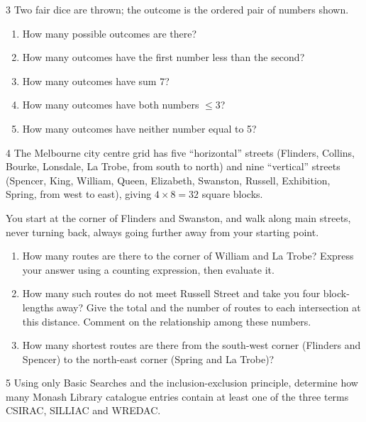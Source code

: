 \begin{exercise}{3}
    Two fair dice are thrown; the outcome is the ordered pair of numbers shown.
    \begin{enumerate}[label=(\alph*)]
        \item How many possible outcomes are there?
        \item How many outcomes have the first number less than the second?
        \item How many outcomes have sum 7?
        \item How many outcomes have both numbers $\le3$?
        \item How many outcomes have neither number equal to 5?
    \end{enumerate}
\end{exercise}

\begin{exercise}{4}
    The Melbourne city centre grid has five ``horizontal'' streets (Flinders,
    Collins, Bourke, Lonsdale, La Trobe, from south to north) and nine
    ``vertical'' streets (Spencer, King, William, Queen, Elizabeth, Swanston,
    Russell, Exhibition, Spring, from west to east), giving $4\times8=32$ square
    blocks.

    You start at the corner of Flinders and Swanston, and walk along main streets,
    never turning back, always going further away from your starting point.
    \begin{enumerate}[label=(\alph*)]
        \item How many routes are there to the corner of William and La Trobe?
              Express your answer using a counting expression, then evaluate it.
        \item How many such routes do not meet Russell Street and take you four
              block-lengths away? Give the total and the number of routes to each
              intersection at this distance. Comment on the relationship among
              these numbers.
        \item How many shortest routes are there from the south-west corner
              (Flinders and Spencer) to the north-east corner (Spring and La
              Trobe)?
    \end{enumerate}
\end{exercise}

\begin{exercise}{5}
    Using only Basic Searches and the inclusion-exclusion principle, determine how
    many Monash Library catalogue entries contain at least one of the three terms
    CSIRAC, SILLIAC and WREDAC.
\end{exercise}

